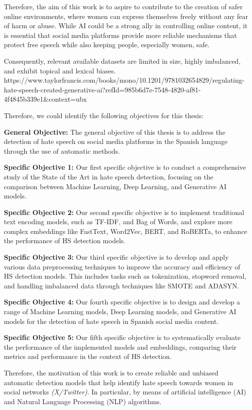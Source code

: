 Therefore, the aim of this work is to aspire to contribute to the creation of safer online environments, where women can express themselves freely without any fear of harm or abuse. While AI could be a strong ally in controlling online content, it is essential that social media platforms provide more reliable mechanisms that protect free speech while also keeping people, especially women, safe.

\color{red}
Consequently, relevant available datasets are limited in size, highly imbalanced, and exhibit topical and lexical biases. https://www.taylorfrancis.com/books/mono/10.1201/9781032654829/regulating-hate-speech-created-generative-ai?refId=985b6d7e-7548-4820-af81-4f4845b339e1&context=ubx
\color{black}

Therefore, we could identify the following objectives for this thesis:

\textbf{General Objective:} The general objective of this thesis is to address the detection of hate speech on social media platforms in the Spanish language through the use of automatic methods.

\textbf{Specific Objective 1:} Our first specific objective is to conduct a comprehensive study of the State of the Art in hate speech detection, focusing on the comparison between Machine Learning, Deep Learning, and Generative AI models.

\textbf{Specific Objective 2:} Our second specific objective is to implement traditional text encoding models, such as TF-IDF, and Bag of Words, and explore more complex embeddings like FastText, Word2Vec, BERT, and RoBERTa, to enhance the performance of HS detection models.

\textbf{Specific Objective 3:} Our third specific objective is to develop and apply various data preprocessing techniques to improve the accuracy and efficiency of HS detection models. This includes tasks such as tokenization, stopword removal, and handling imbalanced data through techniques like SMOTE and ADASYN.

\textbf{Specific Objective 4:} Our fourth specific objective is to design and develop a range of Machine Learning models, Deep Learning models, and Generative AI models for the detection of hate speech in Spanish social media content.

\textbf{Specific Objective 5:} Our fifth specific objective is to systematically evaluate the performance of the implemented models and embeddings, comparing their metrics and performance in the context of HS detection.

Therefore, the motivation of this work is to create reliable and unbiased automatic detection models that help identify hate speech towards women in social networks \textit{(X/Twitter)}. In particular, by means of artificial intelligence (AI) and Natural Language Processing (NLP) algorithms.

\newpage